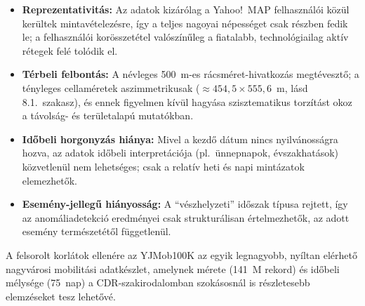 \begin{itemize}
    \item \textbf{Reprezentativitás:} Az adatok kizárólag a Yahoo!~MAP felhasználói közül kerültek mintavételezésre, így a teljes nagoyai népességet csak részben fedik le; a felhasználói korösszetétel valószínűleg a fiatalabb, technológiailag aktív rétegek felé tolódik el.
    \item \textbf{Térbeli felbontás:} A névleges 500~m-es rácsméret-hivatkozás megtévesztő; a tényleges cellaméretek aszimmetrikusak ($\approx 454{,}5 \times 555{,}6$~m, lásd 8.1.\ szakasz), és ennek figyelmen kívül hagyása szisztematikus torzítást okoz a távolság- és területalapú mutatókban.
    \item \textbf{Időbeli horgonyzás hiánya:} Mivel a kezdő dátum nincs nyilvánosságra hozva, az adatok időbeli interpretációja (pl.\ ünnepnapok, évszakhatások) közvetlenül nem lehetséges; csak a relatív heti és napi mintázatok elemezhetők.
    \item \textbf{Esemény-jellegű hiányosság:} A \enquote{vészhelyzeti} időszak típusa rejtett, így az anomáliadetekció eredményei csak strukturálisan értelmezhetők, az adott esemény természetétől függetlenül.
\end{itemize}

A felsorolt korlátok ellenére az YJMob100K az egyik legnagyobb, nyíltan elérhető nagyvárosi mobilitási adatkészlet, amelynek mérete (141~M rekord) és időbeli mélysége (75~nap) a CDR-szakirodalomban szokásosnál is részletesebb elemzéseket tesz lehetővé.
